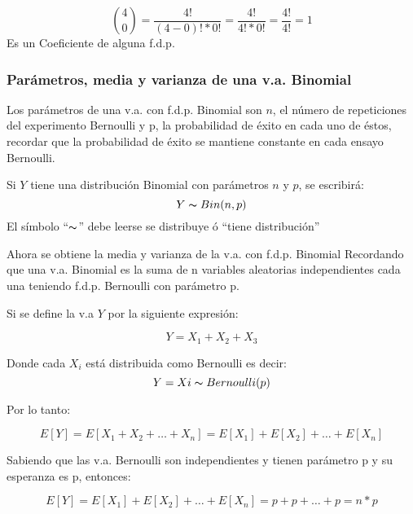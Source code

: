 \begin{notation}
    \begin{equation*}
        \binom{4}{0}=\frac{4!}{( 4-0 )!*0!}=\frac{4!}{4 !*0 !}=\frac{4 !}{4 !}=1
    \end{equation*}
    Es un Coeficiente de alguna f.d.p.
\end{notation}

\subsubsection{Parámetros, media y varianza de
    una v.a. Binomial}

Los parámetros de una v.a. con f.d.p. Binomial son $n$, el número de
repeticiones del experimento Bernoulli y p, la probabilidad de éxito en cada
uno de éstos, recordar que la probabilidad de éxito se mantiene constante
en cada ensayo Bernoulli.

\begin{notation}
    Si $Y$ tiene una distribución Binomial con parámetros $n$ y $p$, se escribirá:
    \begin{equation*}
        Y\thicksim Bin(n,p)
    \end{equation*}
    El símbolo ``$\thicksim$'' debe leerse se distribuye ó ``tiene distribución''
\end{notation}


Ahora se obtiene la media y varianza de la v.a. con f.d.p. Binomial
Recordando que una v.a. Binomial es la suma de n variables aleatorias
independientes cada una teniendo f.d.p. Bernoulli con parámetro p.


Si se define la v.a $Y$ por la siguiente expresión:

\begin{equation}
    Y=X_1+X_2+X_3
\end{equation}

Donde cada $X_i$ está distribuida como Bernoulli es decir:
\begin{equation}
    Y=Xi\thicksim Bernoulli( p)
\end{equation}

Por lo tanto:

\begin{equation}
    E[Y]=E [X_1+X_2+\dots +X_n] =E [X_1]+E[X_2]+\dots+E [X_n]
\end{equation}

Sabiendo que las v.a. Bernoulli son independientes y tienen parámetro p y su
esperanza es p, entonces:

\begin{equation}
    E[ Y ]=E [ X_1 ] +E[ X_2 ]+\dots+E [ X_n] =p+p+\dots +p=n*p
\end{equation}

